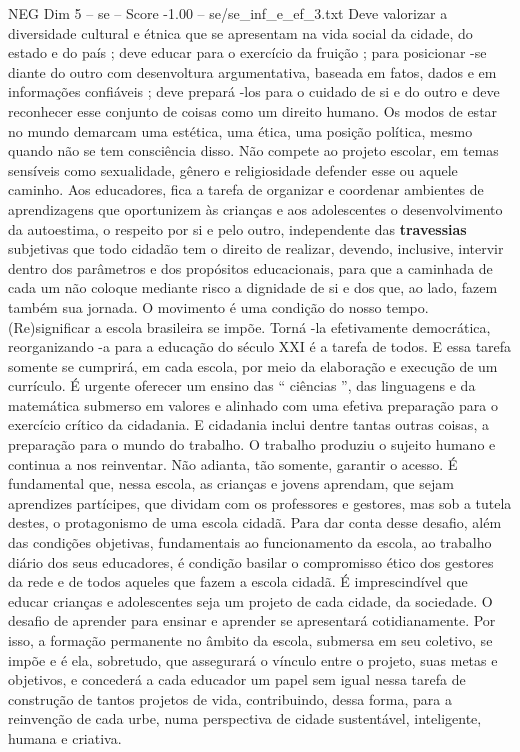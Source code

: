 \begin{textsample}{NEG Dim 5 – se – Score -1.00 – se/se\_inf\_e\_ef\_3.txt}
Deve valorizar a diversidade cultural e étnica que se apresentam na vida social da cidade, do estado e do país ; deve educar para o exercício da fruição ; para posicionar -se diante do outro com desenvoltura argumentativa, baseada em fatos, dados e em informações confiáveis ; deve prepará -los para o cuidado de si e do outro e deve reconhecer esse conjunto de coisas como um direito humano.
Os modos de estar no mundo demarcam uma estética, uma ética, uma posição política, mesmo quando não se tem consciência disso.
Não compete ao projeto escolar, em temas sensíveis como sexualidade, gênero e religiosidade defender esse ou aquele caminho.
Aos educadores, fica a tarefa de organizar e coordenar ambientes de aprendizagens que oportunizem às crianças e aos adolescentes o desenvolvimento da autoestima, o respeito por si e pelo outro, independente das \textbf{travessias} subjetivas que todo cidadão tem o direito de realizar, devendo, inclusive, intervir dentro dos parâmetros e dos propósitos educacionais, para que a caminhada de cada um não coloque mediante risco a dignidade de si e dos que, ao lado, fazem também sua jornada.
O movimento é uma condição do nosso tempo. (Re)significar a escola brasileira se impõe.
Torná -la efetivamente democrática, reorganizando -a para a educação do século XXI é a tarefa de todos.
E essa tarefa somente se cumprirá, em cada escola, por meio da elaboração e execução de um currículo.
É urgente oferecer um ensino das “ ciências ”, das linguagens e da matemática submerso em valores e alinhado com uma efetiva preparação para o exercício crítico da cidadania.
E cidadania inclui dentre tantas outras coisas, a preparação para o mundo do trabalho.
O trabalho produziu o sujeito humano e continua a nos reinventar.
Não adianta, tão somente, garantir o acesso.
É fundamental que, nessa escola, as crianças e jovens aprendam, que sejam aprendizes partícipes, que dividam com os professores e gestores, mas sob a tutela destes, o protagonismo de uma escola cidadã.
Para dar conta desse desafio, além das condições objetivas, fundamentais ao funcionamento da escola, ao trabalho diário dos seus educadores, é condição basilar o compromisso ético dos gestores da rede e de todos aqueles que fazem a escola cidadã.
É imprescindível que educar crianças e adolescentes seja um projeto de cada cidade, da sociedade.
O desafio de aprender para ensinar e aprender se apresentará cotidianamente.
Por isso, a formação permanente no âmbito da escola, submersa em seu coletivo, se impõe e é ela, sobretudo, que assegurará o vínculo entre o projeto, suas metas e objetivos, e concederá a cada educador um papel sem igual nessa tarefa de construção de tantos projetos de vida, contribuindo, dessa forma, para a reinvenção de cada urbe, numa perspectiva de cidade sustentável, inteligente, humana e criativa.

\end{textsample}
